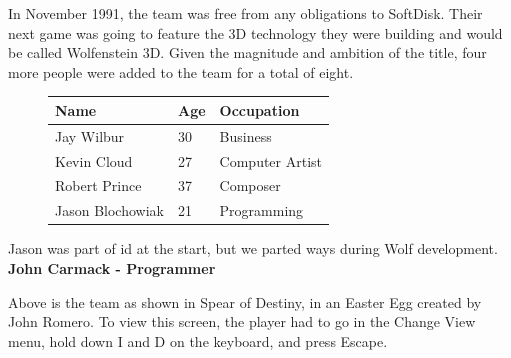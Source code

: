 \documentclass[book.tex]{subfiles}
\begin{document}
In November 1991, the team was free from any obligations to SoftDisk. Their next game was going to feature the 3D technology they were building and would be called Wolfenstein 3D. Given the magnitude and ambition of the title, four more people were added to the team for a total of eight.\\
 \begin{figure}[H]
\centering  
\begin{tabularx}{\textwidth}{ X  X  X  }
  \toprule
  \textbf{Name} &  \textbf{Age} & \textbf{Occupation} \\
  \toprule 
   Jay Wilbur & 30 &  Business\\
   Kevin Cloud\protect\footnotemark & 27 &  Computer Artist\\
   Robert Prince\protect\footnotemark & 37 &  Composer\\
   Jason Blochowiak\protect\footnotemark & 21 &   Programming\\
     \toprule
\end{tabularx}
\label{fig:Id Software hires}
\end{figure}
\addtocounter{footnote}{-2}

\begin{fancyquotes}
Jason was part of id at the start, but we parted ways during Wolf development.
 \bigskip \\
\textbf{John Carmack - Programmer}
 \end{fancyquotes}


 
\begin{figure}[H]
\centering
  
    

\label{fig:id_team_1993}
\end{figure}
\par
Above is the team as shown in Spear of Destiny, in an Easter Egg created by John Romero. To view this screen, the player had to go in the Change View menu, hold down I and D on the keyboard, and press Escape.
\end{document}
